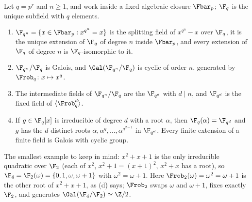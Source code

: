 \begin{theorem}\label{thm:galois:finite-fields}
Let $q=p^r$ and $n\ge1$, and work inside a fixed algebraic closure $\Fbar_p$; $\F_q$ is the unique subfield with $q$ elements.
\begin{enumerate}[label=(\alph*)]
\item $\F_{q^n}=\{x\in\Fbar_p:x^{q^n}=x\}$ is the splitting field of $x^{q^n}-x$ over $\F_q$, it is the unique extension of $\F_q$ of degree $n$ inside $\Fbar_p$,
and every extension of $\F_q$ of degree $n$ is $\F_q$-isomorphic to it.
\item $\F_{q^n}/\F_q$ is Galois, and $\Gal(\F_{q^n}/\F_q)$ is cyclic of order $n$, generated by $\Frob_q\colon x\mapsto x^q$.
\item The intermediate fields of $\F_{q^n}/\F_q$ are the $\F_{q^d}$ with $d\mid n$, and $\F_{q^d}$ is the fixed field of $\langle\Frob_q^d\rangle$.
\item If $g\in\F_q[x]$ is irreducible of degree $d$ with a root $\alpha$, then $\F_q(\alpha)=\F_{q^d}$ and $g$ has the $d$ distinct roots
$\alpha,\alpha^q,\dots,\alpha^{q^{d-1}}$ in $\F_{q^d}$. Every finite extension of a finite field is Galois with cyclic group.
\end{enumerate}
\end{theorem}

The smallest example to keep in mind: $x^2+x+1$ is the only irreducible quadratic over $\F_2$ (each of $x^2$, $x^2+1=(x+1)^2$, $x^2+x$ has a root), so
$\F_4=\F_2(\omega)=\{0,1,\omega,\omega+1\}$ with $\omega^2=\omega+1$. Here $\Frob_2(\omega)=\omega^2=\omega+1$ is the other root of $x^2+x+1$, as (d) says;
$\Frob_2$ swaps $\omega$ and $\omega+1$, fixes exactly $\F_2$, and generates $\Gal(\F_4/\F_2)\simeq\Z/2$.

